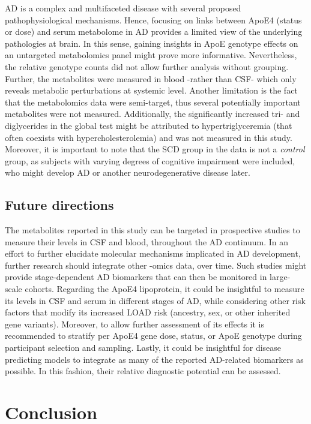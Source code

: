 \documentclass{amsart}
\begin{document}
AD is a complex and multifaceted disease with several proposed pathophysiological mechanisms. Hence, focusing on links between ApoE4 (status or dose) and serum metabolome in AD provides a limited view of the underlying pathologies at brain. In this sense, gaining insights in ApoE genotype effects on an untargeted metabolomics panel might prove more informative. Nevertheless, the relative genotype counts did not allow further analysis without grouping. Further, the metabolites were measured in blood -rather than CSF- which only reveals metabolic perturbations at systemic level. Another limitation is the fact that the metabolomics data were semi-target, thus several potentially important metabolites were not measured. Additionally, the significantly increased tri- and diglycerides in the global test might be attributed to hypertriglyceremia (that often coexists with hypercholesterolemia) and was not measured in this study. Moreover, it is important to note that the SCD group in the data is not a \textit{control} group, as subjects with varying degrees of cognitive impairment were included, who might develop AD or another neurodegenerative disease later.

\subsection{Future directions}
The metabolites reported in this study can be targeted in prospective studies to measure their levels in CSF and blood, throughout the AD continuum. In an effort to further elucidate molecular mechanisms implicated in AD development, further research should integrate other -omics data, over time. Such studies might provide stage-dependent AD biomarkers that can then be monitored in large-scale cohorts. Regarding the ApoE4 lipoprotein, it could be insightful to measure its levels in CSF and serum in different stages of AD, while considering other risk factors that modify its increased LOAD risk (ancestry, sex, or other inherited gene variants). Moreover, to allow further assessment of its effects it is recommended to stratify per ApoE4 gene dose, status, or ApoE genotype during participant selection and sampling. Lastly, it could be insightful for disease predicting models to integrate as many of the reported AD-related biomarkers as possible. In this fashion, their relative diagnostic potential can be assessed.
\clearpage
\section{Conclusion} \label{concl}
\end{document}

